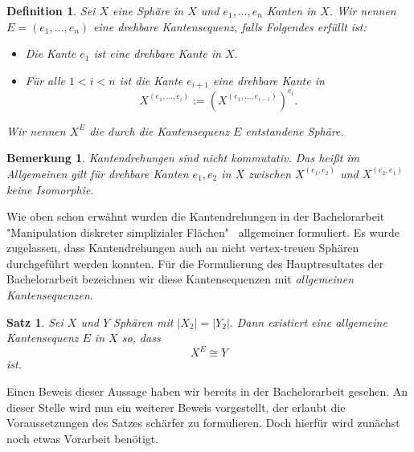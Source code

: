 \documentclass[12pt,titlepage,twoside,cleardoublepage]{article}
\theoremstyle{nummermitklammern}
\newtheorem{definition}[temp]{Definition}
\newtheorem{bemerkung}[temp]{Bemerkung}
\newtheorem{satz}[temp]{Satz}
\newtheorem{definition}[zahl]{Definition}
\newtheorem{bemerkung}[zahl]{Bemerkung}
\newtheorem{satz}[zahl]{Satz}
\numberwithin{equation}{section}
\begin{document}
\begin{definition}
Sei $X$ eine Sphäre in $X$ und $e_1,\ldots,e_n$ Kanten in $X$. Wir nennen $E=(e_1,\ldots,e_n)$ eine \emph{drehbare Kantensequenz}, falls Folgendes erfüllt ist: 
\begin{itemize}
\item Die Kante $e_1$ ist eine drehbare Kante in $X.$ 
\item Für alle $1< i < n$ ist die Kante $e_{i+1}$ eine drehbare Kante in 
\[
X^{(e_1,\ldots,e_i)}:=(X^{(e_1,\ldots,e_{i-1})})^{e_i}.
\] 
\end{itemize}
Wir nennen $X^E$ die durch die Kantensequenz $E$ entstandene Sphäre. 
\end{definition}

\begin{bemerkung}
Kantendrehungen sind nicht kommutativ. Das heißt im Allgemeinen gilt für drehbare Kanten $e_1,e_2$ in $X$ zwischen $X^{(e_1,e_2)}$ und $X^{(e_2,e_1)}$ keine Isomorphie. 

\end{bemerkung}

Wie oben schon erwähnt wurden die Kantendrehungen in der Bachelorarbeit "Manipulation diskreter simplizialer Flächen"  \,
 allgemeiner formuliert. Es wurde zugelassen, dass Kantendrehungen auch an nicht vertex-treuen Sphären durchgeführt werden konnten. Für die Formulierung des Hauptresultates der Bachelorarbeit bezeichnen wir diese Kantensequenzen mit \emph{allgemeinen Kantensequenzen}.
\begin{satz}
Sei $X$ und $Y$ Sphären mit $\vert X_2\vert=\vert Y_2\vert.$ Dann existiert eine allgemeine Kantensequenz $E$ in $X$ so, dass 
\[
X^E \cong Y
\]
ist. 
\end{satz}
Einen Beweis dieser Aussage haben wir bereits in der Bachelorarbeit gesehen. An dieser Stelle wird nun ein weiterer Beweis vorgestellt, der erlaubt die Voraussetzungen des Satzes schärfer zu formulieren. Doch hierfür wird zunächst noch etwas Vorarbeit benötigt.
\end{document}
